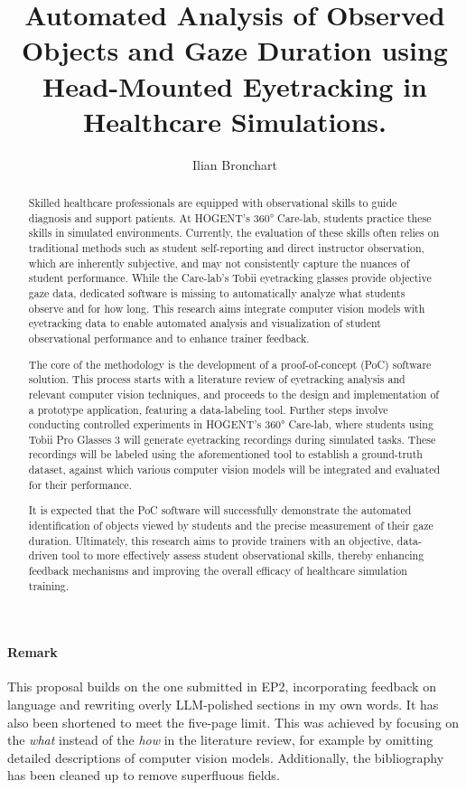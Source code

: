 \documentclass[english]{hogent-article}
\title{Automated Analysis of Observed Objects and Gaze Duration using Head-Mounted Eyetracking in Healthcare Simulations.}
\author{Ilian Bronchart}
\begin{document}
\begin{abstract}
Skilled healthcare professionals are equipped with observational skills to guide diagnosis and support patients.
At HOGENT's 360° Care-lab, students practice these skills in simulated environments.
Currently, the evaluation of these skills often relies on traditional methods such as student 
self-reporting and direct instructor observation, which are inherently subjective, and may not 
consistently capture the nuances of student performance. 
While the Care-lab's Tobii eyetracking glasses provide objective gaze data, dedicated software 
is missing to automatically analyze what students observe and for how long.
This research aims integrate computer vision models with eyetracking data 
to enable automated analysis and visualization of student observational performance and to enhance trainer feedback.

The core of the methodology is the development of a proof-of-concept (PoC) software solution. 
This process starts with a literature review of eyetracking analysis and relevant computer vision techniques, 
and proceeds to the design and implementation of a prototype application, featuring a data-labeling tool. 
Further steps involve conducting controlled experiments in HOGENT's 360° Care-lab, 
where students using Tobii Pro Glasses 3 will generate eyetracking recordings during simulated tasks. 
These recordings will be labeled using the aforementioned tool to establish a ground-truth dataset, 
against which various computer vision models will be integrated and evaluated for their 
performance.

It is expected that the PoC software will successfully demonstrate the automated identification 
of objects viewed by students and the precise measurement of their gaze duration. 
Ultimately, this research aims to provide trainers with an objective, data-driven tool to more effectively assess 
student observational skills, thereby enhancing feedback mechanisms and improving the overall efficacy of healthcare simulation training.
\end{abstract}

\bigskip

\paragraph{Remark}

This proposal builds on the one submitted in EP2, incorporating feedback on language and rewriting overly LLM-polished sections in my own words. 
It has also been shortened to meet the five-page limit. This was achieved by focusing on the \textit{what} instead of the \textit{how} in the literature review, for example 
by omitting detailed descriptions of computer vision models.
Additionally, the bibliography has been cleaned up to remove superfluous fields.
\end{document}

